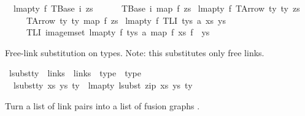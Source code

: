 \begin{isabellebody}
\ \ {\isachardoublequoteopen}lmap{\isacharunderscore}{\kern0pt}ty\ f\ {\isacharparenleft}{\kern0pt}TBase\ i\ zs{\isacharparenright}{\kern0pt}\ {\isacharequal}{\kern0pt}\isanewline
\ \ \ \ \ TBase\ i\ {\isacharparenleft}{\kern0pt}map\ f\ zs{\isacharparenright}{\kern0pt}{\isachardoublequoteclose}\isanewline
{\isacharbar}{\kern0pt}\ {\isachardoublequoteopen}lmap{\isacharunderscore}{\kern0pt}ty\ f\ {\isacharparenleft}{\kern0pt}TArrow\ ty{}\ ty{}\ zs{\isacharparenright}{\kern0pt}\ {\isacharequal}{\kern0pt}\isanewline
\ \ \ \ \ TArrow\ ty{}\ ty{}\ {\isacharparenleft}{\kern0pt}map\ f\ zs{\isacharparenright}{\kern0pt}{\isachardoublequoteclose}\isanewline
{\isacharbar}{\kern0pt}\ {\isachardoublequoteopen}lmap{\isacharunderscore}{\kern0pt}ty\ f\ {\isacharparenleft}{\kern0pt}TLI\ tys\ a\ xs\ ys{\isacharparenright}{\kern0pt}\ {\isacharequal}{\kern0pt}\isanewline
\ \ \ \ \ TLI\ {\isacharparenleft}{\kern0pt}image{\isacharunderscore}{\kern0pt}mset\ {\isacharparenleft}{\kern0pt}lmap{\isacharunderscore}{\kern0pt}ty\ f{\isacharparenright}{\kern0pt}\ tys{\isacharparenright}{\kern0pt}\ a\ {\isacharparenleft}{\kern0pt}map\ f\ xs{\isacharparenright}{\kern0pt}\ {\isacharparenleft}{\kern0pt}f\ {\isacharbar}{\kern0pt}{\isacharbackquote}{\kern0pt}{\isacharbar}{\kern0pt}\ ys{\isacharparenright}{\kern0pt}{\isachardoublequoteclose}%
\begin{isamarkuptext}%
Free-link substitution on types.
Note: this substitutes only free links.%
\end{isamarkuptext}\isamarkuptrue%
\isamarkupfalse%
\ lsubst{\isacharunderscore}{\kern0pt}ty\ {\isacharcolon}{\kern0pt}{\isacharcolon}{\kern0pt}\ {\isachardoublequoteopen}links\ {\isacharequal}{\kern0pt}{\isachargreater}{\kern0pt}\ links\ {\isacharequal}{\kern0pt}{\isachargreater}{\kern0pt}\ type\ {\isacharequal}{\kern0pt}{\isachargreater}{\kern0pt}\ type{\isachardoublequoteclose}\ \isanewline
\ \ {\isachardoublequoteopen}lsubst{\isacharunderscore}{\kern0pt}ty\ xs\ ys\ ty\ {\isacharequal}{\kern0pt}\ lmap{\isacharunderscore}{\kern0pt}ty\ {\isacharparenleft}{\kern0pt}lsubst\ {\isacharparenleft}{\kern0pt}zip\ xs\ ys{\isacharparenright}{\kern0pt}{\isacharparenright}{\kern0pt}\ ty{\isachardoublequoteclose}%
\begin{isamarkuptext}%
Turn a list of link pairs  into a list of fusion graphs .%
\end{isamarkuptext}\isamarkuptrue%

\end{isabellebody}
